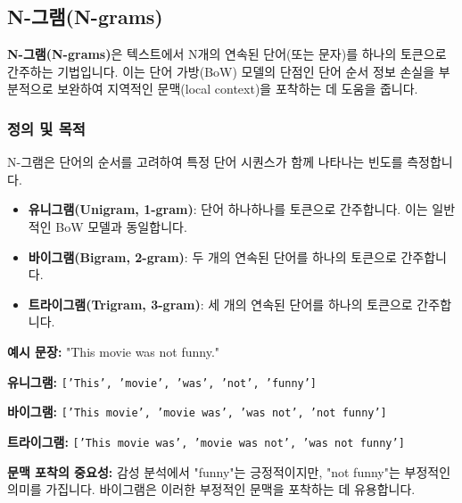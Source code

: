 \documentclass[11pt,a4paper]{article}
\begin{document}
\newpage
\subsection{N-그램(N-grams)}

\begin{conceptbox}
\textbf{N-그램(N-grams)}은 텍스트에서 N개의 연속된 단어(또는 문자)를 하나의 토큰으로 간주하는 기법입니다. 이는 단어 가방(BoW) 모델의 단점인 단어 순서 정보 손실을 부분적으로 보완하여 지역적인 문맥(local context)을 포착하는 데 도움을 줍니다.
\end{conceptbox}

\subsubsection{정의 및 목적}
N-그램은 단어의 순서를 고려하여 특정 단어 시퀀스가 함께 나타나는 빈도를 측정합니다.

\begin{itemize}
    \item \textbf{유니그램(Unigram, 1-gram)}: 단어 하나하나를 토큰으로 간주합니다. 이는 일반적인 BoW 모델과 동일합니다.
    \item \textbf{바이그램(Bigram, 2-gram)}: 두 개의 연속된 단어를 하나의 토큰으로 간주합니다.
    \item \textbf{트라이그램(Trigram, 3-gram)}: 세 개의 연속된 단어를 하나의 토큰으로 간주합니다.
\end{itemize}

\begin{examplebox}
\textbf{예시 문장:} "This movie was not funny."

\textbf{유니그램:} \texttt{['This', 'movie', 'was', 'not', 'funny']}

\textbf{바이그램:} \texttt{['This movie', 'movie was', 'was not', 'not funny']}

\textbf{트라이그램:} \texttt{['This movie was', 'movie was not', 'was not funny']}

\textbf{문맥 포착의 중요성:} 감성 분석에서 "funny"는 긍정적이지만, "not funny"는 부정적인 의미를 가집니다. 바이그램은 이러한 부정적인 문맥을 포착하는 데 유용합니다.
\end{examplebox}
\end{document}
